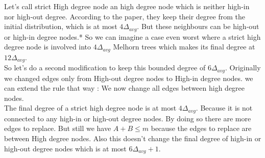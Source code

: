 \documentclass{article}
\begin{document}
Let's call strict High degree node an high degree node which is neither
high-in nor high-out degree. According to the paper, they keep their
degree from the initial distribution, which is at most $4\Delta_{avg}$.
But these neighbours can be high-out or high-in degree nodes.*
So we can imagine a case even worst where a strict high degree node
is involved into $4\Delta_{avg}$ Melhorn trees which makes its
final degree at $12\Delta_{avg}$.\\

So let's do a second modification to keep this bounded degree of $6\Delta_{avg}$.
Originally we changed edges only from High-out degree nodes
to High-in degree nodes. we can extend the rule that way :
We now change all edges between high degree nodes.\\

The final degree of a strict high degree node is at most $4\Delta_{avg}$.
Because it is not connected to any high-in or high-out degree nodes.
By doing so there are more edges to replace.
But still we have $ A + B \leq m$
because the edges to replace are between High degree nodes.
Also this doesn't change the final degree of high-in or
high-out degree nodes which is at most $6\Delta_{avg} + 1$.
\end{document}
